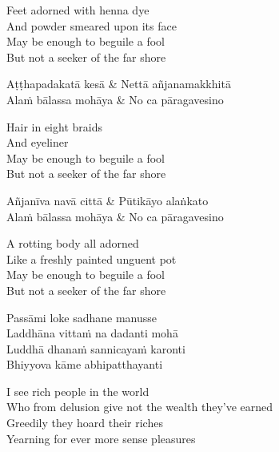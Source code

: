 \begin{english}
  Feet adorned with henna dye\\
  And powder smeared upon its face\\
  May be enough to beguile a fool\\
  But not a seeker of the far shore
\end{english}

\begin{twochants}
  Aṭṭhapadakatā kesā & Nettā añjanamakkhitā\\
  Alaṁ bālassa mohāya & No ca pāragavesino\\
\end{twochants}

\begin{english}
  Hair in eight braids\\
  And eyeliner\\
  May be enough to beguile a fool\\
  But not a seeker of the far shore
\end{english}

\begin{twochants}
  Añjanīva navā cittā & Pūtikāyo alaṅkato\\
  Alaṁ bālassa mohāya & No ca pāragavesino\\
\end{twochants}

\begin{english}
  A rotting body all adorned\\
  Like a freshly painted unguent pot\\
  May be enough to beguile a fool\\
  But not a seeker of the far shore
\end{english}

\begin{twochants}
  Passāmi loke sadhane manusse\\
  Laddhāna vittaṁ na dadanti mohā\\
  Luddhā dhanaṁ sannicayaṁ karonti\\
  Bhiyyova kāme abhipatthayanti
\end{twochants}

\begin{english}
  I see rich people in the world\\
  Who from delusion give not the wealth they’ve earned\\
  Greedily they hoard their riches\\
  Yearning for ever more sense pleasures
\end{english}


